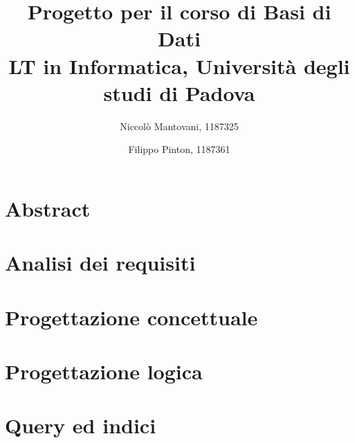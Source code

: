 \documentclass[a4paper,10pt]{article}
\begin{document}
\title{%
    Progetto per il corso di Basi di Dati \\
    \large LT in Informatica, Università degli studi di Padova}
\author{Niccolò Mantovani, 1187325
    \and
    Filippo Pinton, 1187361}
\date{}

\maketitle


\section{Abstract}


\section{Analisi dei requisiti}


\section{Progettazione concettuale}


\section{Progettazione logica}


\section{Query ed indici}

\end{document}
